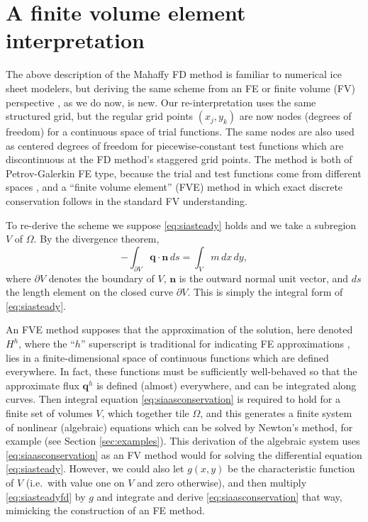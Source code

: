 \documentclass[twocolumn]{igs}
\newcommand\bn{\mathbf{n}}
\newcommand\bq{\mathbf{q}}
\begin{document}
\section{A finite volume element interpretation} \label{sec:fveinterpretation}

The above description of the Mahaffy FD method is familiar to numerical ice sheet modelers, but deriving the same scheme from an FE or finite volume (FV) perspective \cite{LeVeque}, as we do now, is new.  Our re-interpretation uses the same structured grid, but the regular grid points $(x_j,y_k)$ are now nodes (degrees of freedom) for a continuous space of trial functions.  The same nodes are also used as centered degrees of freedom for piecewise-constant test functions which are discontinuous at the FD method's staggered grid points.  The method is both of Petrov-Galerkin FE type, because the trial and test functions come from different spaces \cite{Elmanetal2005}, and a ``finite volume element'' (FVE) method \cite{EwingLinLin2002} in which exact discrete conservation follows in the standard FV understanding.

To re-derive the scheme we suppose \eqref{eq:siasteady} holds and we take a subregion $V$ of $\Omega$.  By the divergence theorem,
\begin{equation}
  - \int_{\partial V} \bq \cdot \bn\,ds = \int_V m\, dx\,dy, \label{eq:siaasconservation}
\end{equation}
where $\partial V$ denotes the boundary of $V$, $\bn$ is the outward normal unit vector, and $ds$ the length element on the closed curve $\partial V$.  This is simply the integral form of \eqref{eq:siasteady}.

An FVE method supposes that the approximation of the solution, here denoted $H^h$, where the ``$h$'' superscript is traditional for indicating FE approximations \cite{Elmanetal2005}, lies in a finite-dimensional space of continuous functions which are defined everywhere.  In fact, these functions must be sufficiently well-behaved so that the approximate flux $\bq^h$ is defined (almost) everywhere, and can be integrated along curves.  Then integral equation \eqref{eq:siaasconservation} is required to hold for a finite set of volumes $V$, which together tile $\Omega$, and this generates a finite system of nonlinear (algebraic) equations which can be solved by Newton's method, for example (see Section \ref{sec:examples}).  This derivation of the algebraic system uses \eqref{eq:siaasconservation} as an FV method would for solving the differential equation \eqref{eq:siasteady}.  However, we could also let $g(x,y)$ be the characteristic function of $V$ (i.e.~with value one on $V$ and zero otherwise), and then multiply \eqref{eq:siasteadyfd} by $g$ and integrate and derive \eqref{eq:siaasconservation} that way, mimicking the construction of an FE method.
\end{document}
